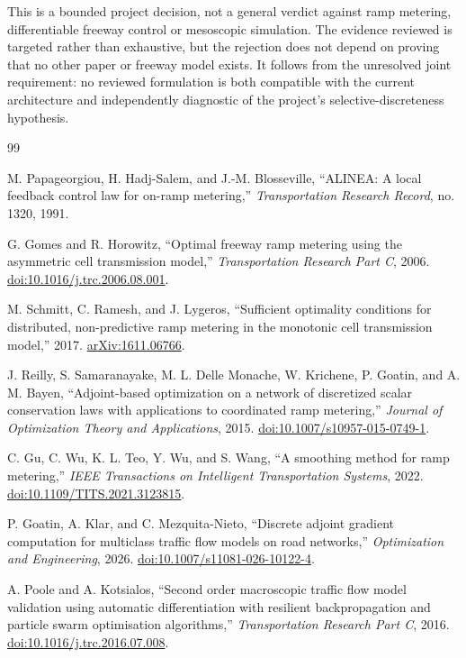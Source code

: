 \documentclass[10pt]{article}
\begin{document}
This is a bounded project decision, not a general verdict against ramp metering, differentiable freeway control or mesoscopic simulation. The evidence reviewed is targeted rather than exhaustive, but the rejection does not depend on proving that no other paper or freeway model exists. It follows from the unresolved joint requirement: no reviewed formulation is both compatible with the current architecture and independently diagnostic of the project's selective-discreteness hypothesis.

\clearpage
\small
\begin{thebibliography}{99}

M. Papageorgiou, H. Hadj-Salem, and J.-M. Blosseville,
``ALINEA: A local feedback control law for on-ramp metering,''
\emph{Transportation Research Record}, no. 1320, 1991.

G. Gomes and R. Horowitz,
``Optimal freeway ramp metering using the asymmetric cell transmission model,''
\emph{Transportation Research Part C}, 2006.
\href{https://doi.org/10.1016/j.trc.2006.08.001}{doi:10.1016/j.trc.2006.08.001}.

M. Schmitt, C. Ramesh, and J. Lygeros,
``Sufficient optimality conditions for distributed, non-predictive ramp metering in the monotonic cell transmission model,'' 2017.
\href{https://arxiv.org/abs/1611.06766}{arXiv:1611.06766}.

J. Reilly, S. Samaranayake, M. L. Delle Monache, W. Krichene, P. Goatin, and A. M. Bayen,
``Adjoint-based optimization on a network of discretized scalar conservation laws with applications to coordinated ramp metering,''
\emph{Journal of Optimization Theory and Applications}, 2015.
\href{https://doi.org/10.1007/s10957-015-0749-1}{doi:10.1007/s10957-015-0749-1}.

C. Gu, C. Wu, K. L. Teo, Y. Wu, and S. Wang,
``A smoothing method for ramp metering,''
\emph{IEEE Transactions on Intelligent Transportation Systems}, 2022.
\href{https://doi.org/10.1109/TITS.2021.3123815}{doi:10.1109/TITS.2021.3123815}.

P. Goatin, A. Klar, and C. Mezquita-Nieto,
``Discrete adjoint gradient computation for multiclass traffic flow models on road networks,''
\emph{Optimization and Engineering}, 2026.
\href{https://doi.org/10.1007/s11081-026-10122-4}{doi:10.1007/s11081-026-10122-4}.

A. Poole and A. Kotsialos,
``Second order macroscopic traffic flow model validation using automatic differentiation with resilient backpropagation and particle swarm optimisation algorithms,''
\emph{Transportation Research Part C}, 2016.
\href{https://doi.org/10.1016/j.trc.2016.07.008}{doi:10.1016/j.trc.2016.07.008}.


\end{thebibliography}
\end{document}
